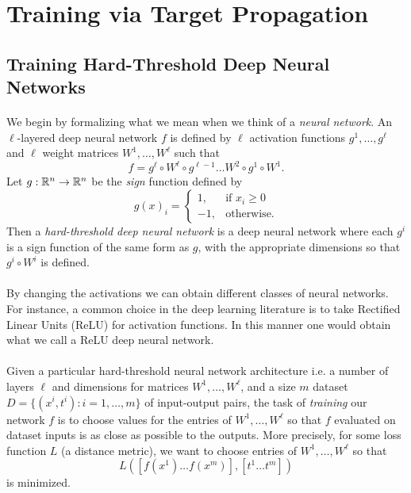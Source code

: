 \section{Training via Target Propagation} 

\subsection{Training Hard-Threshold Deep Neural Networks}
\paragraph{}
We begin by formalizing what we mean when we think of a \emph{neural network}. An $\ell$-layered deep neural network $f$ is defined by $\ell$ activation functions $g^1, \dots, g^\ell$ and $\ell$ weight matrices $W^1,\dots, W^\ell$ such that
$$f = g^\ell \circ W^\ell \circ g^{\ell-1} \dots W^2 \circ g^1 \circ W^1.$$
Let $g: \mathbb{R}^n\rightarrow \mathbb{R}^n$ be the \emph{sign} function defined by
$$g(x)_i = \begin{cases}
	1, &\text{if $x_i \geq 0$} \\
	-1, &\text{otherwise}.
\end{cases}
$$
Then a \emph{hard-threshold deep neural network} is a deep neural network where each $g^i$ is a sign function of the same form as $g$, with the appropriate dimensions so that $g^i \circ W^i$ is defined. 
\paragraph{}
By changing the activations we can obtain different classes of neural networks. For instance, a common choice in the deep learning literature is to take Rectified Linear Units (ReLU) for activation functions. In this manner one would obtain what we call a ReLU deep neural network.
\paragraph{}
Given a particular hard-threshold neural network architecture i.e. a number of layers $\ell$ and dimensions for matrices $W^1, \dots, W^\ell$, and a size $m$ dataset $D = \{(x^i, t^i): i =1,\dots, m\}$ of input-output pairs, the task of \emph{training} our network $f$ is to choose values for the entries of $W^1, \dots, W^\ell$ so that $f$ evaluated on dataset inputs is as close as possible to the outputs. More precisely, for some loss function $L$ (a distance metric), we want to choose entries of $W^1, \dots, W^\ell$ so that
$$L([f(x^1)\dots f(x^m)], [t^1\dots t^m])$$
is minimized.
